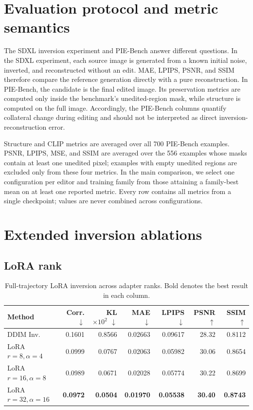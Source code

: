 \documentclass{article} %
\begin{document}
\section{Evaluation protocol and metric semantics}
\label{sec:evaluation-protocol}
The SDXL inversion experiment and PIE-Bench answer different questions. In the SDXL experiment, each source image is generated from a known initial noise, inverted, and reconstructed without an edit. MAE, LPIPS, PSNR, and SSIM therefore compare the reference generation directly with a pure reconstruction. In PIE-Bench, the candidate is the final edited image. Its preservation metrics are computed only inside the benchmark's unedited-region mask, while structure is computed on the full image. Accordingly, the PIE-Bench columns quantify collateral change during editing and should not be interpreted as direct inversion-reconstruction error. 

Structure and CLIP metrics are averaged over all 700 PIE-Bench examples. PSNR, LPIPS, MSE, and SSIM are averaged over the 556 examples whose masks contain at least one unedited pixel; examples with empty unedited regions are excluded only from these four metrics. In the main comparison, we select one configuration per editor and training family from those attaining a family-best mean on at least one reported metric. Every row contains all metrics from a single checkpoint; values are never combined across configurations.

\section{Extended inversion ablations}
\label{sec:extended-inversion}
\subsection{LoRA rank}
\begin{table}[h]
    \centering
    \small
    \caption{Full-trajectory LoRA inversion across adapter ranks. Bold denotes the best result in each column.}
    \label{tab:lora-rank-comparison}
    \begin{tabular}{lrrrrrr}
        \toprule
        Method & Corr. $\downarrow$ & KL $\times10^2$ $\downarrow$ & MAE $\downarrow$ & LPIPS $\downarrow$ & PSNR $\uparrow$ & SSIM $\uparrow$ \\
        \midrule
        DDIM Inv. & 0.1601 & 0.8566 & 0.02663 & 0.09617 & 28.32 & 0.8112 \\
        LoRA $r=8,\alpha=4$ & 0.0999 & 0.0767 & 0.02063 & 0.05982 & 30.06 & 0.8654 \\
        LoRA $r=16,\alpha=8$ & 0.0989 & 0.0671 & 0.02028 & 0.05774 & 30.22 & 0.8699 \\
        LoRA $r=32,\alpha=16$ & \textbf{0.0972} & \textbf{0.0504} & \textbf{0.01970} & \textbf{0.05538} & \textbf{30.40} & \textbf{0.8743} \\
        \bottomrule
    \end{tabular}
\end{table}
\end{document}
